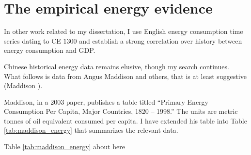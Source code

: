 \documentclass[12pt]{article}
\numberwithin{equation}{section}
\begin{document}

	\section*{The empirical energy evidence}
	
	In other work related to my dissertation, I use English energy consumption time series dating to CE $1300$ and establish a strong correlation over history between energy consumption and GDP.
	
	Chinese historical energy data remains elusive, though my search continues. What follows is data from Angus Maddison and others, that is at least suggestive (Maddison \citeyear[p.~10]{maddison_growth_2003}).
	
	Maddison, in a 2003 paper, publishes a table titled ``Primary Energy Consumption Per Capita, Major Countries, 1820 -- 1998.'' The units are metric tonnes of oil equivalent consumed per capita. I have extended his table into Table \ref{tab:maddison_energy} that summarizes the relevant data.

\begin{center}
Table \ref{tab:maddison_energy} about here
\end{center}	
\end{document}
